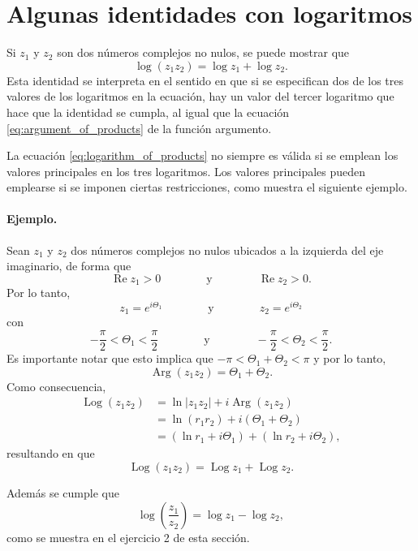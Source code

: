 \documentclass[a4paper]{report}
\renewcommand{\Re}{\operatorname{Re}}
\DeclareMathOperator{\Arg}{Arg}
\DeclareMathOperator{\Log}{Log}
\begin{document}
\section{Algunas identidades con logaritmos}\label{sec:logarithm_identities}

Si \(z_1\) y \(z_2\) son dos números complejos no nulos, se puede mostrar que 
\begin{equation}\label{eq:logarithm_of_products}
 \log(z_1z_2)=\log z_1+\log z_2. 
\end{equation}
Esta identidad se interpreta en el sentido en que si se especifican dos de los tres valores de los logaritmos en la ecuación, hay un valor del tercer logaritmo que hace que la identidad se cumpla, al igual que la ecuación \ref{eq:argument_of_products} de la función argumento.

La ecuación \ref{eq:logarithm_of_products} no siempre es válida si se emplean los valores principales en los tres logaritmos. Los valores principales pueden emplearse si se imponen ciertas restricciones, como muestra el siguiente ejemplo.

\paragraph{Ejemplo.} Sean \(z_1\) y \(z_2\) dos números complejos no nulos ubicados a la izquierda del eje imaginario, de forma que
\[
 \Re z_1>0
 \qquad\qquad\textrm{y}\qquad\qquad
 \Re z_2>0.
\]
Por lo tanto,
\[
 z_1=e^{i\Theta_1}
 \qquad\qquad\textrm{y}\qquad\qquad
 z_2=e^{i\Theta_2}
\]
con 
\[
 -\frac{\pi}{2}<\Theta_1<\frac{\pi}{2}
 \qquad\qquad\textrm{y}\qquad\qquad
 -\frac{\pi}{2}<\Theta_2<\frac{\pi}{2}.
\]
Es importante notar que esto implica que \(-\pi<\Theta_1+\Theta_2<\pi\) y por lo tanto,
\[
 \Arg(z_1z_2)=\Theta_1+\Theta_2.
\]
Como consecuencia,
\begin{align*}
 \Log(z_1z_2)&=\ln|z_1z_2|+i\Arg(z_1z_2)\\
  &=\ln(r_1r_2)+i(\Theta_1+\Theta_2)\\
  &=(\ln r_1+i\Theta_1)+(\ln r_2+i\Theta_2),
\end{align*}
resultando en que 
\[
 \Log(z_1z_2)=\Log z_1+\Log z_2.
\]

Además se cumple que 
\begin{equation}\label{eq:logarithm_of_quotient}
 \log\left(\frac{z_1}{z_2}\right)=\log z_1-\log z_2,
\end{equation}
como se muestra en el ejercicio 2 de esta sección.
\end{document}
